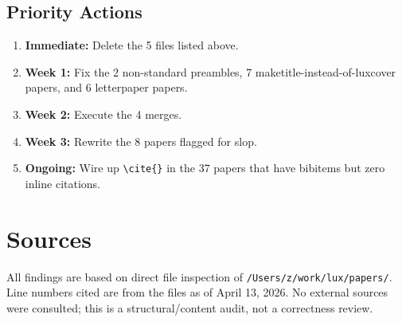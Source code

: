 \documentclass[11pt,a4paper]{article}
\begin{document}
\subsection{Priority Actions}

\begin{enumerate}
\item \textbf{Immediate:} Delete the 5 files listed above.
\item \textbf{Week 1:} Fix the 2 non-standard preambles, 7 maketitle-instead-of-luxcover papers, and 6 letterpaper papers.
\item \textbf{Week 2:} Execute the 4 merges.
\item \textbf{Week 3:} Rewrite the 8 papers flagged for slop.
\item \textbf{Ongoing:} Wire up \texttt{\textbackslash cite\{\}} in the 37 papers that have bibitems but zero inline citations.
\end{enumerate}

\section{Sources}

All findings are based on direct file inspection of \texttt{/Users/z/work/lux/papers/}.
Line numbers cited are from the files as of April 13, 2026. No external sources
were consulted; this is a structural/content audit, not a correctness review.
\end{document}
